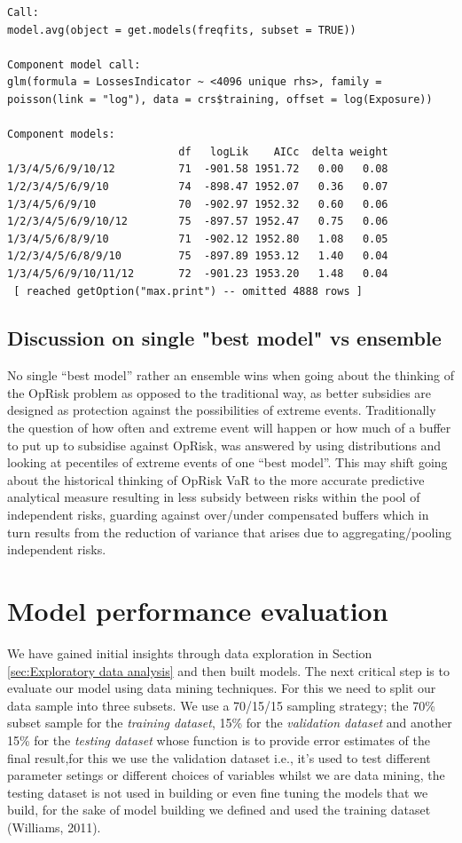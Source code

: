 \documentclass{DissertateUSU}
\begin{document}
\singlespacing
\begin{verbatim}
Call:
model.avg(object = get.models(freqfits, subset = TRUE))

Component model call: 
glm(formula = LossesIndicator ~ <4096 unique rhs>, family = 
poisson(link = "log"), data = crs$training, offset = log(Exposure))

Component models: 
                           df   logLik    AICc  delta weight
1/3/4/5/6/9/10/12          71  -901.58 1951.72   0.00   0.08
1/2/3/4/5/6/9/10           74  -898.47 1952.07   0.36   0.07
1/3/4/5/6/9/10             70  -902.97 1952.32   0.60   0.06
1/2/3/4/5/6/9/10/12        75  -897.57 1952.47   0.75   0.06
1/3/4/5/6/8/9/10           71  -902.12 1952.80   1.08   0.05
1/2/3/4/5/6/8/9/10         75  -897.89 1953.12   1.40   0.04
1/3/4/5/6/9/10/11/12       72  -901.23 1953.20   1.48   0.04
 [ reached getOption("max.print") -- omitted 4888 rows ]

\end{verbatim}       
\doublespacing

\subsection{Discussion on single "best model" vs ensemble}

No single ``best model'' rather an ensemble wins when going about the
thinking of the OpRisk problem as opposed to the traditional way, as
better subsidies are designed as protection against the possibilities of
extreme events. Traditionally the question of how often and extreme
event will happen or how much of a buffer to put up to subsidise against
OpRisk, was answered by using distributions and looking at pecentiles of
extreme events of one ``best model''. This may shift going about the
historical thinking of OpRisk VaR to the more accurate predictive
analytical measure resulting in less subsidy between risks within the
pool of independent risks, guarding against over/under compensated
buffers which in turn results from the reduction of variance that arises
due to aggregating/pooling independent risks.

\section{Model performance evaluation}

We have gained initial insights through data exploration in Section
\ref{sec:Exploratory data analysis} and then built models. The next
critical step is to evaluate our model using data mining techniques. For
this we need to split our data sample into three subsets. We use a
70/15/15 sampling strategy; the 70\% subset sample for the
\emph{training dataset}, 15\% for the \emph{validation dataset} and
another 15\% for the \emph{testing dataset} whose function is to provide
error estimates of the final result,for this we use the validation
dataset i.e., it's used to test different parameter setings or different
choices of variables whilst we are data mining, the testing dataset is
not used in building or even fine tuning the models that we build, for
the sake of model building we defined and used the training dataset
(Williams, 2011).\medskip    
\end{document}
